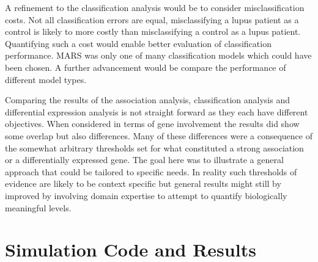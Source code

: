 \documentclass[a4paper, 12pt]{report}
\begin{document}
A refinement to the classification analysis would be to consider misclassification costs. Not all classification errors are equal, misclassifying a lupus patient as a control is likely to more costly than misclassifying a control as a lupus patient. Quantifying such a cost would enable better evaluation of classification performance. MARS was only one of many classification models which could have been chosen. A further advancement would be compare the performance of different model types.

Comparing the results of the association analysis, classification analysis and differential expression analysis is not straight forward as they each have different objectives. When considered in terms of gene involvement the results did show some overlap  but also differences. Many of these differences were a consequence of the somewhat arbitrary thresholds set for what constituted a strong association or a differentially expressed gene. The goal here was to illustrate a general approach that could be tailored to specific needs. In reality such thresholds of evidence are likely to be context specific but general results might still by improved by involving domain expertise to attempt to quantify biologically meaningful levels.










\printglossary

\appendix

\chapter{Simulation Code and Results}
\end{document}
